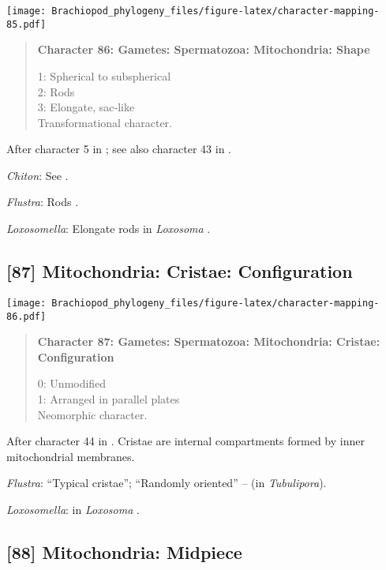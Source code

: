 \documentclass[openany]{book}
\theoremstyle{definition}
\theoremstyle{definition}
\theoremstyle{definition}
\theoremstyle{remark}
\begin{document}
\texttt{[image: Brachiopod\_phylogeny\_files/figure-latex/character-mapping-85.pdf]}

\begin{quote}
\textbf{Character 86: Gametes: Spermatozoa: Mitochondria: Shape}

1: Spherical to subspherical\\
2: Rods\\
3: Elongate, sac-like\\
Transformational character.
\end{quote}

After character 5 in \citet{BucklandNicks2008}; see also character 43 in
\citet{Ponder1997}.

\hypertarget{Chiton-coding-86}{}
\emph{Chiton}: See \citet{BucklandNicks1988}.

\hypertarget{Flustra-coding-86}{}
\emph{Flustra}: Rods \citep{Franzen1981}.

\hypertarget{Loxosomella-coding-86}{}
\emph{Loxosomella}: Elongate rods in \emph{Loxosoma}
\citep{Franzen2000}.

\subsection*{{[}87{]} Mitochondria: Cristae:
Configuration}\label{mitochondria-cristae-configuration}

\texttt{[image: Brachiopod\_phylogeny\_files/figure-latex/character-mapping-86.pdf]}

\begin{quote}
\textbf{Character 87: Gametes: Spermatozoa: Mitochondria: Cristae:
Configuration}

0: Unmodified\\
1: Arranged in parallel plates\\
Neomorphic character.
\end{quote}

After character 44 in \citet{Ponder1997}. Cristae are internal
compartments formed by inner mitochondrial membranes.

\hypertarget{Flustra-coding-87}{}
\emph{Flustra}: ``Typical cristae''; ``Randomly oriented'' --
\citet{Franzen1984} (in \emph{Tubulipora}).

\hypertarget{Loxosomella-coding-87}{}
\emph{Loxosomella}: in \emph{Loxosoma} \citep{Franzen2000}.

\subsection*{{[}88{]} Mitochondria:
Midpiece}\label{mitochondria-midpiece}
\end{document}
